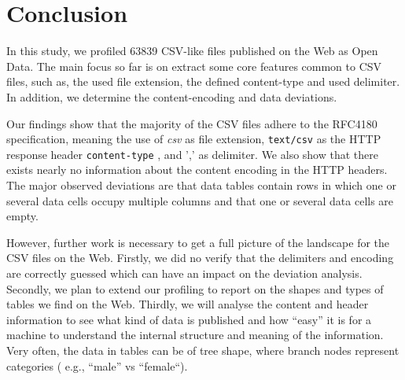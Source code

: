 \documentclass{scrartcl}
\begin{document}
\section{Conclusion}
In this study, we profiled 63839 CSV-like files published on the Web as Open Data. The main focus so far is on extract some core features common to CSV files, such as, the used file extension, the defined content-type and used delimiter. In addition, we determine the content-encoding and data deviations. 

Our findings show that the majority of the CSV files adhere to the RFC4180 specification, meaning the use of \textit{csv} as file extension, \texttt{text/csv} as the HTTP response header \texttt{content-type} , and ',' as delimiter.
We also show that there exists nearly no information about the content encoding in the HTTP headers.
The major observed deviations are that data tables contain rows in which one or several data cells occupy multiple columns and that one or several data cells are empty.

However, further work is necessary to get a full picture of the landscape for the CSV files on the Web. 
Firstly, we did no verify that the delimiters and encoding are correctly guessed which can have an impact on the deviation analysis. 
Secondly, we plan to extend our profiling to report on the shapes and types of tables we find on the Web. 
Thirdly, we will analyse the content and header information to see what kind of data is published and how ``easy'' it is for a machine to understand the internal structure and meaning of the information. 
Very often, the data in tables can be of tree shape, where branch nodes represent categories ( e.g., ``male'' vs ``female``).


%











\printbibliography 
\end{document}
